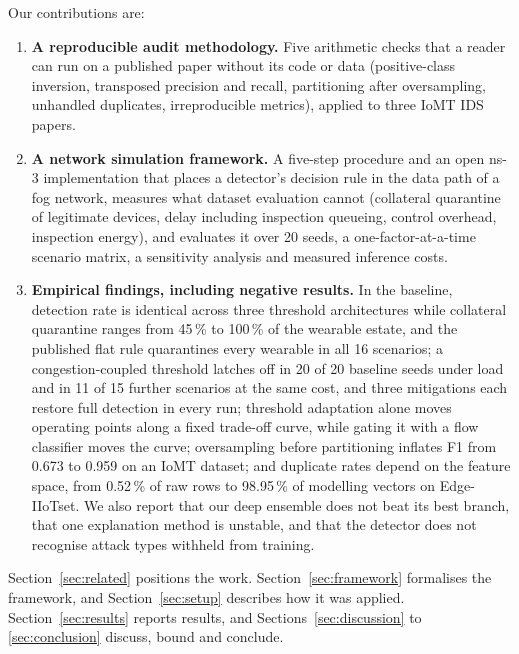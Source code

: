 Our contributions are:
\begin{enumerate}[leftmargin=1.3em,itemsep=1pt,topsep=2pt]
\item \textbf{A reproducible audit methodology.} Five arithmetic checks that a reader can run on a published paper without its code or data (positive-class inversion, transposed precision and recall, partitioning after oversampling, unhandled duplicates, irreproducible metrics), applied to three IoMT IDS papers.
\item \textbf{A network simulation framework.} A five-step procedure and an open ns-3 implementation that places a detector's decision rule in the data path of a fog network, measures what dataset evaluation cannot (collateral quarantine of legitimate devices, delay including inspection queueing, control overhead, inspection energy), and evaluates it over 20 seeds, a one-factor-at-a-time scenario matrix, a sensitivity analysis and measured inference costs.
\item \textbf{Empirical findings, including negative results.} In the baseline, detection rate is identical across three threshold architectures while collateral quarantine ranges from 45\,\% to 100\,\% of the wearable estate, and the published flat rule quarantines every wearable in all 16 scenarios; a congestion-coupled threshold latches off in 20 of 20 baseline seeds under load and in 11 of 15 further scenarios at the same cost, and three mitigations each restore full detection in every run; threshold adaptation alone moves operating points along a fixed trade-off curve, while gating it with a flow classifier moves the curve; oversampling before partitioning inflates F1 from 0.673 to 0.959 on an IoMT dataset; and duplicate rates depend on the feature space, from 0.52\,\% of raw rows to 98.95\,\% of modelling vectors on Edge-IIoTset. We also report that our deep ensemble does not beat its best branch, that one explanation method is unstable, and that the detector does not recognise attack types withheld from training.
\end{enumerate}

Section~\ref{sec:related} positions the work. Section~\ref{sec:framework} formalises the framework, and Section~\ref{sec:setup} describes how it was applied. Section~\ref{sec:results} reports results, and Sections~\ref{sec:discussion} to \ref{sec:conclusion} discuss, bound and conclude.
